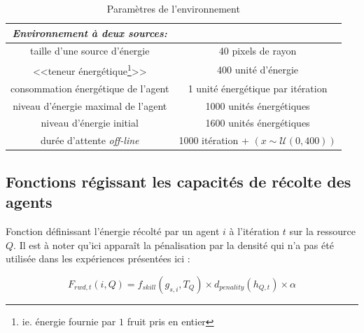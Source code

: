 \documentclass[a4paper,10pt]{report}
\begin{document}
	\begin{table}[H]
	
	\caption{Paramètres de l'environnement}\label{tab:params2}
	\begin{tabular}{cc} 
	\hline
	\textbf{\textit{Environnement à deux sources:}} & \\ 
	\hline
	\hline
	taille d'une source d'énergie & 40 pixels de rayon\\ 
	<<teneur énergétique\footnote{ie. énergie fournie par $1$ fruit pris en entier}>> & 400 unité d'énergie \\ 
	consommation énergétique de l'agent & 1 unité énergétique par itération\\ 
	niveau d'énergie maximal de l'agent & 1000 unités énergétiques \\ 
	niveau d'énergie initial & 1600 unités énergétiques\\ 
	durée d'attente \emph{off-line} & 1000 itération + $(x\sim\mathcal{U}(0,400))$\\ 
	
	\end{tabular}
	
	\end{table}
	
	
	
	
	
	
	\subsection{Fonctions régissant les capacités de récolte des agents}
	
	Fonction définissant l'énergie récolté par un agent $i$ à l'itération $t$ sur la ressource $Q$. Il est à noter qu'ici apparaît la pénalisation par la densité qui n'a pas été utilisée dans les expériences présentées ici :
	
	\begin{equation} 
	F_{rwd,t}(i,Q) = f_{skill}\left(g_{s,i},T_Q\right)\times d_{penality}\left(h_{Q,t}\right)\times \alpha
	\end{equation}\label{eq:reward}
	
\end{document}
